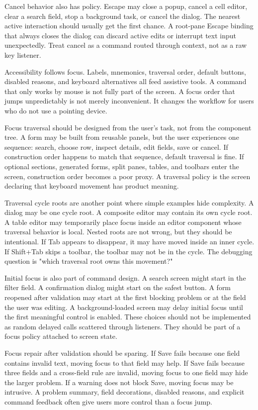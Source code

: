 Cancel behavior also has policy. Escape may close a popup, cancel a cell editor, clear a search field, stop a background task, or cancel the dialog. The nearest active interaction should usually get the first chance. A root-pane Escape binding that always closes the dialog can discard active edits or interrupt text input unexpectedly. Treat cancel as a command routed through context, not as a raw key listener.

Accessibility follows focus. Labels, mnemonics, traversal order, default buttons, disabled reasons, and keyboard alternatives all feed assistive tools. A command that only works by mouse is not fully part of the screen. A focus order that jumps unpredictably is not merely inconvenient. It changes the workflow for users who do not use a pointing device.

Focus traversal should be designed from the user's task, not from the component
tree. A form may be built from reusable panels, but the user experiences one
sequence: search, choose row, inspect details, edit fields, save or cancel. If
construction order happens to match that sequence, default traversal is fine.
If optional sections, generated forms, split panes, tables, and toolbars enter
the screen, construction order becomes a poor proxy. A traversal policy is the
screen declaring that keyboard movement has product meaning.

Traversal cycle roots are another point where simple examples hide complexity.
A dialog may be one cycle root. A composite editor may contain its own cycle
root. A table editor may temporarily place focus inside an editor component
whose traversal behavior is local. Nested roots are not wrong, but they should
be intentional. If Tab appears to disappear, it may have moved inside an inner
cycle. If Shift+Tab skips a toolbar, the toolbar may not be in the cycle. The
debugging question is "which traversal root owns this movement?"

Initial focus is also part of command design. A search screen might start in
the filter field. A confirmation dialog might start on the safest button. A
form reopened after validation may start at the first blocking problem or at
the field the user was editing. A background-loaded screen may delay initial
focus until the first meaningful control is enabled. These choices should not
be implemented as random delayed  calls scattered
through listeners. They should be part of a focus policy attached to screen
state.

Focus repair after validation should be sparing. If Save fails because one
field contains invalid text, moving focus to that field may help. If Save fails
because three fields and a cross-field rule are invalid, moving focus to one
field may hide the larger problem. If a warning does not block Save, moving
focus may be intrusive. A problem summary, field decorations, disabled reasons,
and explicit command feedback often give users more control than a focus jump.

